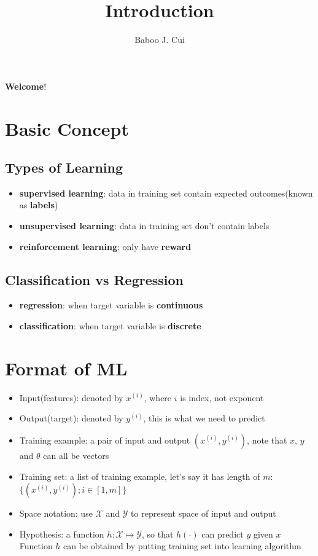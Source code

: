\documentclass[10pt,a4paper,oneside]{article}
\author{Baboo J. Cui}
\begin{document}
\title{Introduction}
\maketitle
\tableofcontents
\newpage

\begin{center}
	\textbf{Welcome}!
\end{center}

\section{Basic Concept}
\subsection{Types of Learning}
\begin{itemize}
	\item\textbf{ supervised learning}: data in training set contain expected outcomes(known as \textbf{labels})
	\item \textbf{unsupervised learning}: data in training set don't contain labels
	\item \textbf{reinforcement learning}: only have \textbf{reward}
\end{itemize}

\subsection{Classification vs Regression}
\begin{itemize}
	\item \textbf{regression}: when target variable is \textbf{continuous}
	\item \textbf{classification}: when target variable is \textbf{discrete}
\end{itemize}

\section{Format of ML}
\begin{itemize}
	\item Input(features): denoted by $x^{(i)}$, where $i$ is index, not exponent
	\item Output(target): denoted by $y^{(i)}$, this is what we need to predict
	\item Training example: a pair of input and output $(x^{(i)}, y^{(i)})$, note that $x$, $y$  and $\theta$ can all be vectors
	\item Training set: a list of training example, let's say it has length of $m$: $\{(x^{(i)}, y^{(i)}); i \in [1,m]\}$
	\item Space notation: use $\mathcal{X}$ and $\mathcal{Y}$ to represent space of input and output
	\item Hypothesis: a function $h:\mathcal{X} \mapsto \mathcal{Y}$, so that $h(\cdot)$ can predict $y$ given $x$ Function $h$ can be obtained by putting training set into learning algorithm
\end{itemize}
\end{document}
